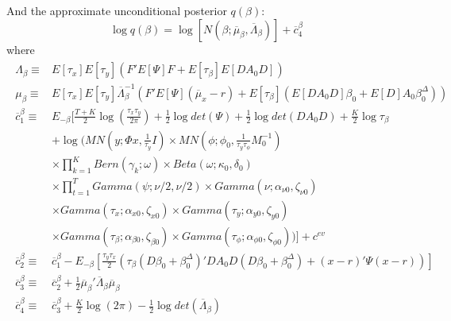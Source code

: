 \documentclass[11pt]{article}
\begin{document}
And the approximate unconditional posterior $q\left(\beta\right)$:
\begin{equation}
	\log q\left(\beta\right)=\log\left[N\left(\beta;\overline{\mu}_{\beta},\overline{\Lambda}_{\beta}\right)\right]+\overline{c}_{4}^{\beta}
\end{equation}
where
\begin{align*}
\begin{split}
	\Lambda_{\beta}\equiv&E\left[\tau_{x}\right]E\left[\tau_{y}\right]\left(F'E\left[\Psi\right]F+E\left[\tau_{\beta}\right]E\left[DA_{0}D\right]\right)\\\mu_{\beta}\equiv&E\left[\tau_{x}\right]E\left[\tau_{y}\right]\overline{\Lambda}_{\beta}^{-1}\left(F'E\left[\Psi\right]\left(\overline{\mu}_{x}-r\right)+E\left[\tau_{\beta}\right]\left(E\left[DA_{0}D\right]\beta_{0}+E\left[D\right]A_{0}\beta_{0}^{\Delta}\right)\right)\\\overline{c}_{1}^{\beta}\equiv&E_{-\beta}\Bigg[\frac{T+K}{2}\log\left(\frac{\tau_{x}\tau_{y}}{2\pi}\right)+\frac{1}{2}\log det\left(\Psi\right)+\frac{1}{2}\log det\left(DA_{0}D\right)+\frac{K}{2}\log\tau_{\beta}\\&+\log\Bigg(MN\left(y;\Phi x,\frac{1}{\tau_{y}}I\right)\times MN\left(\phi;\phi_{0},\frac{1}{\tau_{y}\tau_{\phi}}M_{0}^{-1}\right)\\&\times\prod_{k=1}^{K}Bern\left(\gamma_{k};\omega\right)\times Beta\left(\omega;\kappa_{0},\delta_{0}\right)\\&\times\prod_{t=1}^{T}Gamma\left(\psi;\nu/2,\nu/2\right)\times Gamma\left(\nu;\alpha_{\nu0},\zeta_{\nu0}\right)\\&\times Gamma\left(\tau_{x};\alpha_{x0},\zeta_{x0}\right)\times Gamma\left(\tau_{y};\alpha_{y0},\zeta_{y0}\right)\\&\times Gamma\left(\tau_{\beta};\alpha_{\beta0},\zeta_{\beta0}\right)\times Gamma\left(\tau_{\phi};\alpha_{\phi0},\zeta_{\phi0}\right)\Bigg)\Bigg]+c^{ev}\\\overline{c}_{2}^{\beta}\equiv&\overline{c}_{1}^{\beta}-E_{-\beta}\left[\frac{\tau_{y}\tau_{x}}{2}\left(\tau_{\beta}\left(D\beta_{0}+\beta_{0}^{\Delta}\right)'DA_{0}D\left(D\beta_{0}+\beta_{0}^{\Delta}\right)+\left(x-r\right)'\Psi\left(x-r\right)\right)\right]\\\overline{c}_{3}^{\beta}\equiv&\overline{c}_{2}^{\beta}+\frac{1}{2}\overline{\mu}_{\beta}'\overline{\Lambda}_{\beta}\overline{\mu}_{\beta}\\\overline{c}_{4}^{\beta}\equiv&\overline{c}_{3}^{\beta}+\frac{K}{2}\log\left(2\pi\right)-\frac{1}{2}\log det\left(\overline{\Lambda}_{\beta}\right)
\end{split}
\end{align*}
\end{document}
